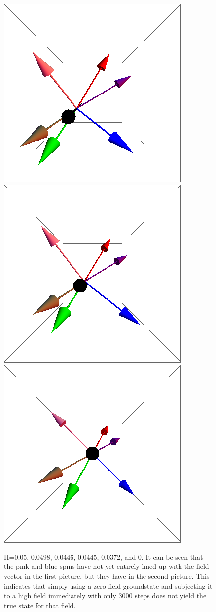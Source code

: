 \documentclass{article}
\begin{document}
\begin{figure}[ht]
\includegraphics[scale=0.24]{100/56S005to000G.png}
\includegraphics[scale=0.24]{100/129S005to000G.png}
\includegraphics[scale=0.24]{100/501S005to000G.png}
\caption{H=0.05, 0.0498, 0.0446, 0.0445, 0.0372, and 0. It can be seen that the pink and blue spins have not yet
entirely lined up with the field vector in the first picture, but they have in the second picture. This indicates that
simply using a zero field groundstate and subjecting it to a high field immediately with only 3000 steps does not yield
the true state for that field.}
\end{figure}
\clearpage
\end{document}
